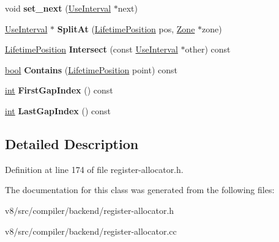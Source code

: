 \begin{DoxyCompactItemize}
void {\bfseries set\+\_\+next} (\mbox{\hyperlink{classv8_1_1internal_1_1compiler_1_1UseInterval}{Use\+Interval}} $\ast$next)
\item 
\mbox{\label{classv8_1_1internal_1_1compiler_1_1UseInterval_a0180944c1453ab4f5a95f634d36bb0f6}} 
\mbox{\hyperlink{classv8_1_1internal_1_1compiler_1_1UseInterval}{Use\+Interval}} $\ast$ {\bfseries Split\+At} (\mbox{\hyperlink{classv8_1_1internal_1_1compiler_1_1LifetimePosition}{Lifetime\+Position}} pos, \mbox{\hyperlink{classv8_1_1internal_1_1Zone}{Zone}} $\ast$zone)
\item 
\mbox{\label{classv8_1_1internal_1_1compiler_1_1UseInterval_a39432630f13de2e9aa2be8173a80f554}} 
\mbox{\hyperlink{classv8_1_1internal_1_1compiler_1_1LifetimePosition}{Lifetime\+Position}} {\bfseries Intersect} (const \mbox{\hyperlink{classv8_1_1internal_1_1compiler_1_1UseInterval}{Use\+Interval}} $\ast$other) const
\item 
\mbox{\label{classv8_1_1internal_1_1compiler_1_1UseInterval_af5634da7b952c7f67c46ae85843a88ca}} 
\mbox{\hyperlink{classbool}{bool}} {\bfseries Contains} (\mbox{\hyperlink{classv8_1_1internal_1_1compiler_1_1LifetimePosition}{Lifetime\+Position}} point) const
\item 
\mbox{\label{classv8_1_1internal_1_1compiler_1_1UseInterval_a72d3071103c59e531610d733d13a67a1}} 
\mbox{\hyperlink{classint}{int}} {\bfseries First\+Gap\+Index} () const
\item 
\mbox{\label{classv8_1_1internal_1_1compiler_1_1UseInterval_a1a1b4be084fb7716318e053b6ba340a9}} 
\mbox{\hyperlink{classint}{int}} {\bfseries Last\+Gap\+Index} () const
\end{DoxyCompactItemize}


\subsection{Detailed Description}


Definition at line 174 of file register-\/allocator.\+h.



The documentation for this class was generated from the following files\+:\begin{DoxyCompactItemize}
\item 
v8/src/compiler/backend/register-\/allocator.\+h\item 
v8/src/compiler/backend/register-\/allocator.\+cc\end{DoxyCompactItemize}
